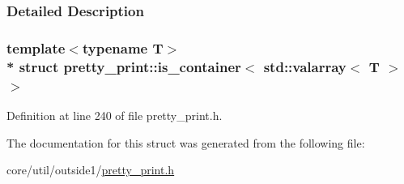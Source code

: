 \subsubsection{Detailed Description}
\subsubsection*{template$<$typename T$>$\\*
struct pretty\+\_\+print\+::is\+\_\+container$<$ std\+::valarray$<$ T $>$ $>$}



Definition at line 240 of file pretty\+\_\+print.\+h.



The documentation for this struct was generated from the following file\+:\begin{DoxyCompactItemize}
\item 
core/util/outside1/\hyperlink{pretty__print_8h}{pretty\+\_\+print.\+h}\end{DoxyCompactItemize}
